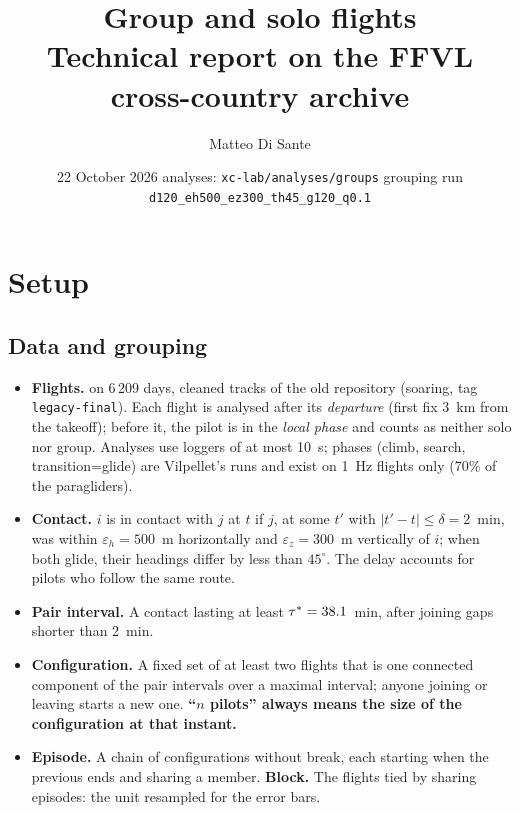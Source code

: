 \documentclass[10pt,a4paper]{article}
\title{\textbf{Group and solo flights}\\[2pt]
  \large Technical report on the FFVL cross-country archive}
\author{Matteo Di Sante}
\date{22 October 2026 \;\textbullet\; analyses: \texttt{xc-lab/analyses/groups} \;\textbullet\;
  grouping run \texttt{d120\_eh500\_ez300\_th45\_g120\_q0.1}}
\begin{document}
\maketitle
\vspace{-14pt}



\section{Setup}\label{sec:setup}

\subsection{Data and grouping}

\begin{itemize}
  \item \textbf{Flights.}  on 6\,209 days, cleaned tracks of the old repository
        (soaring, tag \texttt{legacy-final}). Each flight is analysed after its \emph{departure}
        (first fix 3~km from the takeoff); before it, the pilot is in the \emph{local phase} and
        counts as neither solo nor group. Analyses use loggers of at most 10~s; phases
        (climb, search, transition=glide) are Vilpellet's runs and exist on 1~Hz flights only
        (70\% of the paragliders).
  \item \textbf{Contact.} $i$ is in contact with $j$ at $t$ if $j$, at some $t'$ with
        $|t'-t|\le\delta=2$~min, was within $\varepsilon_h=500$~m horizontally and
        $\varepsilon_z=300$~m vertically of $i$; when both glide, their headings differ by less
        than $45^\circ$. The delay accounts for pilots who follow the same route.
  \item \textbf{Pair interval.} A contact lasting at least $\tau^*=38.1$~min, after joining gaps
        shorter than 2~min.
  \item \textbf{Configuration.} A fixed set of at least two flights that is one connected component
        of the pair intervals over a maximal interval; anyone joining or leaving starts a new one.
        \textbf{``$n$ pilots'' always means the size of the configuration at that instant.}
  \item \textbf{Episode.} A chain of configurations without break, each starting when the previous
        ends and sharing a member. \textbf{Block.} The flights tied by sharing episodes: the unit
        resampled for the error bars.
\end{itemize}
\end{document}
